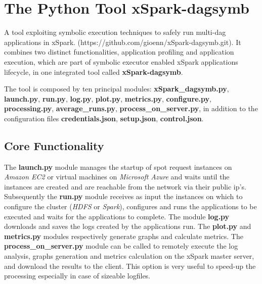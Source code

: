
\section{The Python Tool xSpark-dagsymb}\label{sec:xspark_dagsymb}

A tool exploiting symbolic execution techniques to safely run multi-dag
applications in xSpark. (https://github.com/gioenn/xSpark-dagsymb.git).
It combines two distinct functionalities, application profiling and
application execution, which are part of symbolic executor enabled
xSpark applications lifecycle, in one integrated tool called
\textbf{xSpark-dagsymb}.

The tool is composed by ten principal modules:
\textbf{xSpark\_dagsymb.py}, \textbf{launch.py}, \textbf{run.py},
\textbf{log.py}, \textbf{plot.py}, \textbf{metrics.py},
\textbf{configure.py}, \textbf{processing.py},
\textbf{average\_runs.py}, \textbf{process\_on\_server.py}, in addition
to the configuration files \textbf{credentials.json},
\textbf{setup.json}, \textbf{control.json}.

\hypertarget{core-functionality}{%
\subsection{Core Functionality}\label{core-functionality}}

The \textbf{launch.py} module manages the startup of spot request
instances on \emph{Amazon EC2} or virtual machines on \emph{Microsoft
Azure} and waits until the instances are created and are reachable from
the network via their public ip's. Subsequently the \textbf{run.py}
module receives as input the instances on which to configure the cluster
(\emph{HDFS} or \emph{Spark}), configures and runs the applications to
be executed and waits for the applications to complete. The module
\textbf{log.py} downloads and saves the logs created by the applications
run. The \textbf{plot.py} and \textbf{metrics.py} modules respectively
generate graphs and calculate metrics. The
\textbf{process\_on\_server.py} module can be called to remotely execute
the log analysis, graphs generation and metrics calculation on the
xSpark master server, and download the results to the client. This
option is very useful to speed-up the processing especially in case of
sizeable logfiles.

